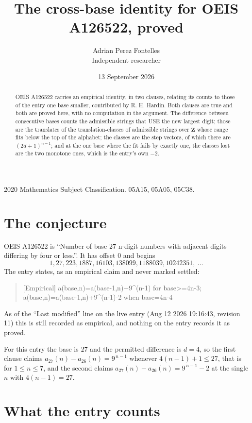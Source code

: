 \documentclass[11pt,a4paper]{article}
\title{The cross-base identity for OEIS A126522, proved}
\author{Adrian Perez Fontelles\\ \small Independent researcher}
\date{13 September 2026}
\theoremstyle{plain}
\theoremstyle{definition}
\begin{document}
\maketitle

\begin{abstract}
OEIS A126522 carries an empirical identity, in two clauses, relating its counts to those of the
entry one base smaller, contributed by R. H. Hardin. Both clauses are true and both are proved
here, with no computation in the argument. The difference between consecutive bases counts the
admissible strings that USE the new largest digit; those are the translates of the
translation-classes of admissible strings over $\mathbf{Z}$ whose range fits below the top of
the alphabet; the classes are the step vectors, of which there are $(2d+1)^{n-1}$; and at the
one base where the fit fails by exactly one, the classes lost are the two monotone ones, which
is the entry's own $-2$.
\end{abstract}

\noindent\small 2020 Mathematics Subject Classification. 05A15, 05A05, 05C38.\normalsize

\section{The conjecture}

OEIS A126522 is ``Number of base 27 n-digit numbers with adjacent digits differing by four or less.''. It has offset $0$ and begins
\[
1, 27, 223, 1887, 16103, 138099, 1188039, 10242351,\ \dots
\]
The entry states, as an empirical claim and never marked settled:
\begin{quote}
[Empirical] a(base,n)=a(base-1,n)+9\textasciicircum{}(n-1) for base>=4n-3; a(base,n)=a(base-1,n)+9\textasciicircum{}(n-1)-2 when base=4n-4
\end{quote}
As of the ``Last modified'' line on the live entry (Aug 12 2026 19:16:43, revision 11)
this is still recorded as empirical, and nothing on the entry records it as proved.

For this entry the base is $27$ and the permitted difference is $d=4$, so the first clause
claims $a_{27}(n)-a_{26}(n)=9^{\,n-1}$ whenever $4(n-1)+1\le27$, that is for
$1\le n\le7$, and the second claims $a_{27}(n)-a_{26}(n)=9^{\,n-1}-2$ at the single
$n$ with $4(n-1)=27$.

\section{What the entry counts}
\end{document}
